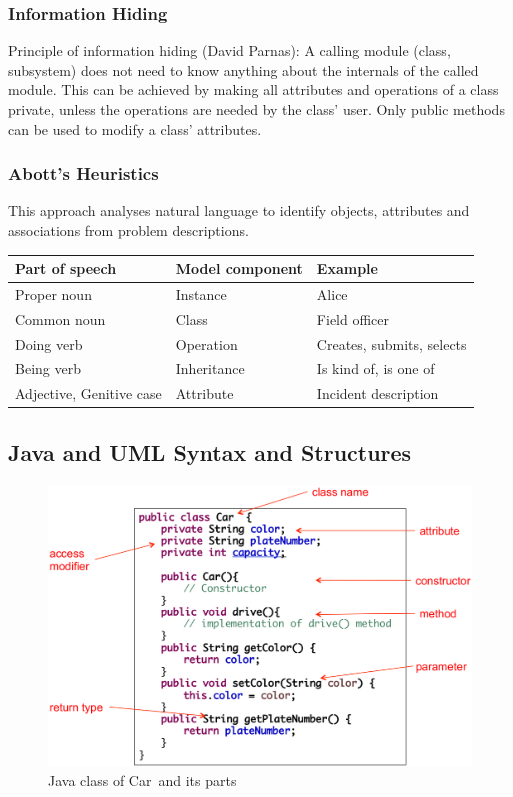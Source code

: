 \subsubsection*{Information Hiding}
Principle of information hiding (David Parnas):
A calling module (class, subsystem) does not need to know anything about the internals of the called module.
This can be achieved by making all attributes and operations of a class private, unless the operations are needed by the class' user.
Only public methods can be used to modify a class' attributes.

\subsubsection*{Abott's	Heuristics}
This approach analyses natural language to identify objects, attributes and associations from problem descriptions.
\begin{center}
	\begin{tabular}{l|l|l}
		\textbf{Part of speech} & \textbf{Model component} & \textbf{Example} \\
		\hline
		Proper noun & Instance & Alice \\
		Common noun & Class & Field officer \\
		Doing verb & Operation & Creates, submits, selects \\
		Being verb & Inheritance & Is kind of, is one of \\
		Adjective, Genitive case & Attribute & Incident description
	\end{tabular} 
\end{center}
\newpage

\subsection{Java and UML Syntax and Structures}
\begin{figure}[h!]
	\centering
	\includegraphics[width=\linewidth]{images/oop_java_class}
	\caption{Java class of \glqq Car\grqq \ and its parts}
\end{figure}

